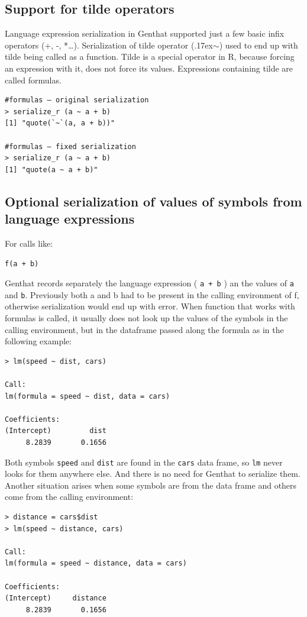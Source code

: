 \documentclass[thesis=B,english]{FITthesis}[2012/10/20]
\begin{document}
\subsection{Support for tilde operators}
Language expression serialization in Genthat supported just a few basic infix operators (+, -, *…). Serialization of tilde operator ({\raise.17ex\hbox{$\scriptstyle\sim$}}) used to end up with tilde being called as a function. Tilde is a special operator in R, because forcing an expression with it, does not force its values. Expressions containing tilde are called formulas.

\begin{verbatim}
#formulas – original serialization
> serialize_r (a ~ a + b)
[1] "quote(`~`(a, a + b))"

#formulas – fixed serialization
> serialize_r (a ~ a + b)
[1] "quote(a ~ a + b)"
\end{verbatim}
    
\subsection{Optional serialization of values of symbols from language expressions}
For calls like:
\begin{verbatim}
f(a + b)
\end{verbatim}

Genthat records separately the language expression ( \verb|a + b| ) an the values of \verb|a| and \verb|b|. Previously both a and b had to be present in the calling environment of f, otherwise serialization would end up with error. When function that works with formulas is called, it usually does not look up the values of the symbols in the calling environment, but in the dataframe passed along the formula as in the following example:

\begin{verbatim}
> lm(speed ~ dist, cars)

Call:
lm(formula = speed ~ dist, data = cars)

Coefficients:
(Intercept)         dist
     8.2839       0.1656
\end{verbatim}

Both symbols \verb|speed| and \verb|dist| are found in the \verb|cars| data frame, so \verb|lm| never looks for them anywhere else. And there is no need for Genthat to serialize them. Another situation arises when some symbols are from the data frame and others come from the calling environment:

\begin{verbatim}
> distance = cars$dist
> lm(speed ~ distance, cars)

Call:
lm(formula = speed ~ distance, data = cars)

Coefficients:
(Intercept)     distance
     8.2839       0.1656
\end{verbatim}
\end{document}
